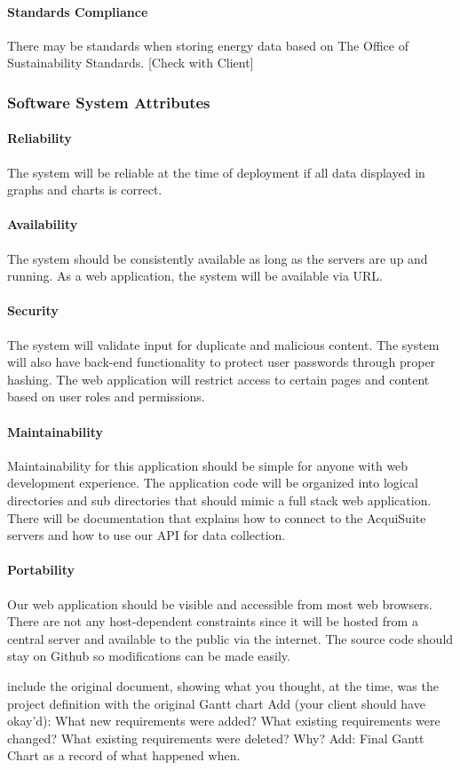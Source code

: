     \paragraph{Standards Compliance}
    There may be standards when storing energy data based on The Office of Sustainability Standards.
    [Check with Client]

    \subsubsection{Software System Attributes}
    
    \paragraph{Reliability}
    The system will be reliable at the time of deployment if all data displayed in graphs and charts is correct.
    \paragraph{Availability}
    The system should be consistently available as long as the servers are up and running. As a web application, the system will be available via URL.
    \paragraph{Security}
    The system will validate input for duplicate and malicious content.
    The system will also have back-end functionality to protect user passwords through proper hashing.
    The web application will restrict access to certain pages and content based on user roles and permissions.

    \paragraph{Maintainability}
    Maintainability for this application should be simple for anyone with web development experience. The application code will be organized into logical directories and sub directories that should mimic a full stack web application. There will be documentation that explains how to connect to the AcquiSuite servers and how to use our API for data collection.
    \paragraph{Portability}
    Our web application should be visible and accessible from most web browsers. There are not any host-dependent constraints since it will be hosted from a central server and available to the public via the internet. The source code should stay on Github so modifications can be made easily.
    


include the original document, showing what you thought, at the time, was the project definition with the original Gantt chart
Add (your client should have okay'd): What new requirements were added? What existing requirements were changed? What existing requirements were deleted? Why? 
Add: Final Gantt Chart as a record of what happened when.